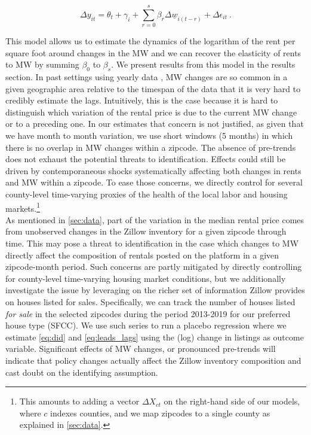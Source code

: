 \begin{equation}\label{eq:lags}
        \Delta y_{it} = \theta_t + \gamma_i 
        		+ \sum_{r=0}^{s}\beta_r \Delta \underline{w}_{i(t-r)} 
        		+ \Delta \epsilon_{it} \ .
\end{equation}

This model allows us to estimate the dynamics of the logarithm of the rent per square foot around 
changes in the MW and we can recover the elasticity of rents to MW by summing $\beta_0$ to 
$\beta_{s}$. We present results from this model in the results section. In past settings using 
yearly data \parencite{tidemann2018mw,yamagishi2019minimum}, MW changes are so common in a given 
geographic area relative to the timespan of the data that it is very hard to credibly estimate the 
lags. Intuitively, this is the case because it is hard to distinguish which variation of the rental 
price is due to the current MW change or to a preceding one. In our estimates that concern is not 
justified, as given that we have month to month variation, we use short windows (5 months) in which 
there is no overlap in MW changes within a zipcode. The absence of pre-trends does not exhaust the 
potential threats to identification. Effects could still be driven by contemporaneous shocks 
systematically affecting both changes in rents and MW within a zipcode. To ease those concerns, we 
directly control for several county-level time-varying proxies of the health of the local labor and 
housing markets.\footnote{This amounts to adding a vector $\Delta X_{ct}$ on the right-hand side of 
	our models, where $c$ indexes counties, and we map zipcodes to a single county as explained in 
	\autoref{sec:data}.} \\

As mentioned in \autoref{sec:data}, part of the variation in the median rental price comes from 
unobserved changes in the Zillow inventory for a given zipcode through time. This may pose a threat 
to identification in the case which changes to MW directly affect the composition of rentals posted on the platform in a given zipcode-month period. Such concerns are partly mitigated by directly controlling for county-level time-varying housing market conditions, but we additionally investigate the issue by leveraging on the richer set of information Zillow provides on houses listed for sales. Specifically, we can track the number of houses listed \textit{for sale} in the selected zipcodes during the period 2013-2019 for our preferred house type (SFCC). We use such series to run a placebo regression where we estimate \autoref{eq:did} and \autoref{eq:leads_lags} using the (log) change in listings as outcome variable.  Significant effects of MW changes, or pronounced pre-trends will indicate that policy changes actually affect the Zillow inventory composition and cast doubt on the identifying assumption. \\


